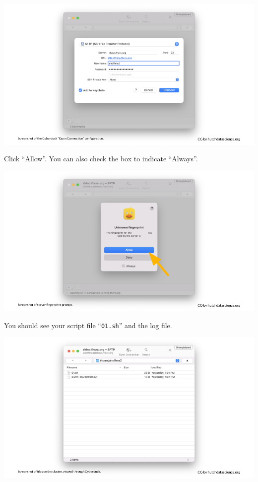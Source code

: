 \documentclass[
]{book}
\begin{document}
\includegraphics[width=1\linewidth]{resources/images/06-upload-download_files/figure-latex//1BQxrVYdKZTbpCaF-i_q9w7s9x034lEXpQZDU-Sl09cs_g1579ffd7b01_12_28}

Click ``Allow''. You can also check the box to indicate ``Always''.

\includegraphics[width=1\linewidth]{resources/images/06-upload-download_files/figure-latex//1BQxrVYdKZTbpCaF-i_q9w7s9x034lEXpQZDU-Sl09cs_g1579ffd7b01_12_33}

You should see your script file ``\texttt{01.sh}'' and the log file.

\includegraphics[width=1\linewidth]{resources/images/06-upload-download_files/figure-latex//1BQxrVYdKZTbpCaF-i_q9w7s9x034lEXpQZDU-Sl09cs_g1579ffd7b01_12_37}
\end{document}
